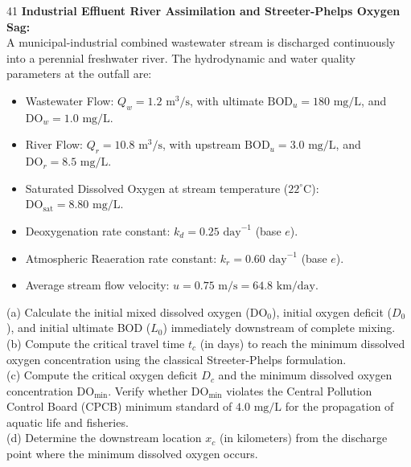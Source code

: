 \begin{subjectiveq}{4}{1}
\textbf{Industrial Effluent River Assimilation and Streeter-Phelps Oxygen Sag:}\\A municipal-industrial combined wastewater stream is discharged continuously into a perennial freshwater river. The hydrodynamic and water quality parameters at the outfall are:\begin{itemize}[leftmargin=1.5em]  \item Wastewater Flow: $Q_w = 1.2\text{ m}^3/\text{s}$, with ultimate $\text{BOD}_u = 180\text{ mg/L}$, and $\text{DO}_w = 1.0\text{ mg/L}$.  \item River Flow: $Q_r = 10.8\text{ m}^3/\text{s}$, with upstream $\text{BOD}_u = 3.0\text{ mg/L}$, and $\text{DO}_r = 8.5\text{ mg/L}$.  \item Saturated Dissolved Oxygen at stream temperature ($22^\circ\text{C}$): $\text{DO}_{\text{sat}} = 8.80\text{ mg/L}$.  \item Deoxygenation rate constant: $k_d = 0.25\text{ day}^{-1}$ (base $e$).  \item Atmospheric Reaeration rate constant: $k_r = 0.60\text{ day}^{-1}$ (base $e$).  \item Average stream flow velocity: $u = 0.75\text{ m/s} = 64.8\text{ km/day}$.\end{itemize}(a) Calculate the initial mixed dissolved oxygen ($\text{DO}_0$), initial oxygen deficit ($D_0$), and initial ultimate BOD ($L_0$) immediately downstream of complete mixing.\\(b) Compute the critical travel time $t_c$ (in days) to reach the minimum dissolved oxygen concentration using the classical Streeter-Phelps formulation.\\(c) Compute the critical oxygen deficit $D_c$ and the minimum dissolved oxygen concentration $\text{DO}_{\text{min}}$. Verify whether $\text{DO}_{\text{min}}$ violates the Central Pollution Control Board (CPCB) minimum standard of $4.0\text{ mg/L}$ for the propagation of aquatic life and fisheries.\\(d) Determine the downstream location $x_c$ (in kilometers) from the discharge point where the minimum dissolved oxygen occurs.
\end{subjectiveq}

